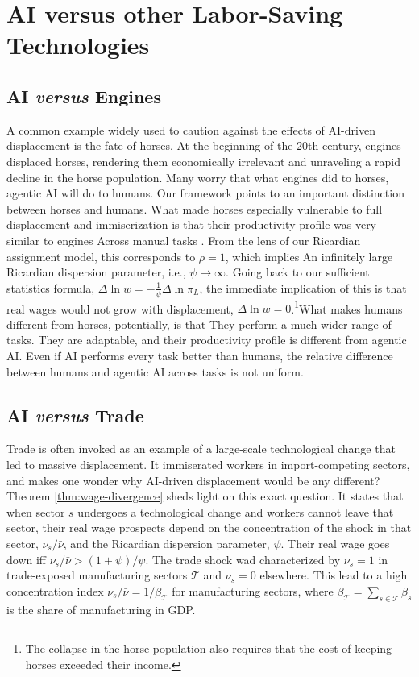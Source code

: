 \documentclass[11pt]{article}
\begin{document}
\section{ AI versus other Labor-Saving Technologies}\label{sec:ai-versus-trade}

\subsection*{AI \emph{versus} Engines}

A common example widely used to caution against the effects of AI-driven
displacement is the fate of horses. At the beginning of the 20th century,
engines displaced horses, rendering them economically irrelevant and
unraveling a rapid decline in the horse population. Many worry that
what engines did to horses, agentic AI will do to humans. Our framework
points to an important distinction between horses and humans. What
made horses especially vulnerable to full displacement and immiserization
is that their productivity profile was very similar to engines Across
manual tasks . From the lens of our Ricardian assignment model, this
corresponds to $\rho=1$, which implies An infinitely large Ricardian
dispersion parameter, i.e., $\psi\rightarrow\infty$. Going back to
our sufficient statistics formula, $\Delta\ln w=-\frac{1}{\psi}\Delta\ln\pi_{L}$,
the immediate implication of this is that real wages would not grow
with displacement, $\Delta\ln w=0$.\footnote{The collapse in the horse population also requires that the cost of
keeping horses exceeded their income.}What makes humans different from horses, potentially, is that They
perform a much wider range of tasks. They are adaptable, and their
productivity profile is different from agentic AI. Even if AI performs
every task better than humans, the relative difference between humans
and agentic AI across tasks is not uniform.

\subsection*{AI \emph{versus} Trade}

Trade is often invoked as an example of a large-scale technological
change that led to massive displacement. It immiserated workers in
import-competing sectors, and makes one wonder why AI-driven displacement
would be any different? Theorem \ref{thm:wage-divergence} sheds light
on this exact question. It states that when sector $s$ undergoes
a technological change and workers cannot leave that sector, their
real wage prospects depend on the concentration of the shock in that
sector, $\nu_{s}/\bar{\nu}$, and the Ricardian dispersion parameter,
$\psi$. Their real wage goes down iff $\nu_{s}/\bar{\nu}>(1+\psi)/\psi$.
The trade shock wad characterized by $\nu_{s}=1$ in trade-exposed
manufacturing sectors $\mathscr{T}$ and $\nu_{s}=0$ elsewhere. This
lead to a high concentration index $\nu_{s}/\bar{\nu}=1/\beta_{\mathscr{T}}$
for manufacturing sectors, where $\beta_{\mathscr{T}}=\sum_{s\in\mathscr{T}}\beta_{s}$
is the share of manufacturing in GDP.
\end{document}
